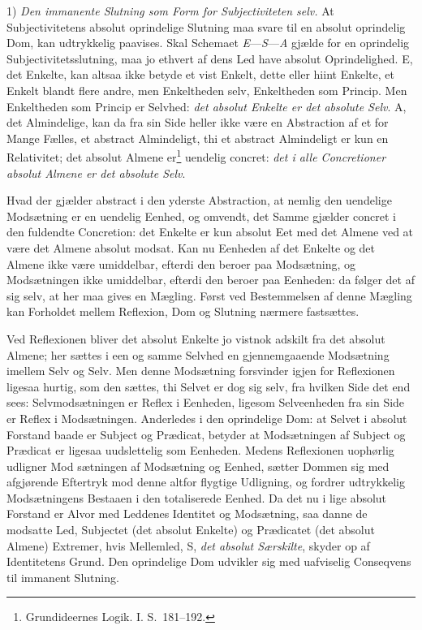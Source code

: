 \documentclass[12pt]{book}
\newcommand{\opage}[1]{\marginnote{\footnotesize\textit{[#1]}}}
\begin{document}
1) \emph{Den immanente Slutning som Form for Subjectiviteten selv.} At Subjectivitetens absolut oprindelige Slutning maa svare til en absolut oprindelig Dom, kan udtrykkelig paavises. Skal Schemaet \textit{E}---\textit{S}---\textit{A} gjælde for en oprindelig Subjectivitetsslutning, maa jo ethvert af
\opage{331}dens Led have absolut Oprindelighed. E, det Enkelte, kan altsaa ikke betyde et vist Enkelt, dette eller hiint Enkelte, et Enkelt blandt flere andre, men Enkeltheden selv, Enkeltheden som Princip. Men Enkeltheden som Princip er Selvhed: \emph{det absolut Enkelte er det absolute Selv}. A, det Almindelige, kan da fra sin Side heller ikke være en Abstraction af et for Mange Fælles, et abstract Almindeligt, thi et abstract Almindeligt er kun en Relativitet; det absolut Almene er\footnote{Grundideernes Logik. I. S.~181--192.}%
{} uendelig concret: \emph{det i alle Concretioner absolut Almene er det absolute Selv}.

Hvad der gjælder abstract i den yderste Abstraction, at nemlig den uendelige Modsætning er en uendelig Eenhed, og omvendt, det Samme gjælder concret i den fuldendte Concretion: det Enkelte er kun absolut Eet med det Almene ved at være det Almene absolut modsat. Kan nu Eenheden af det Enkelte og det Almene ikke være umiddelbar, efterdi den beroer paa Modsætning, og Modsætningen ikke umiddelbar, efterdi den beroer paa Eenheden: da følger det af sig selv, at her maa gives en Mægling. Først ved Bestemmelsen af denne Mægling kan Forholdet mellem Reflexion, Dom og Slutning nærmere fastsættes.

Ved Reflexionen bliver det absolut Enkelte jo vistnok adskilt fra det absolut Almene; her sættes i een og samme Selvhed en gjennemgaaende Modsætning imellem Selv og Selv. Men denne Modsætning forsvinder igjen for Reflexionen ligesaa hurtig, som den sættes, thi Selvet er dog sig selv, fra hvilken Side det end sees: Selvmodsætningen er Reflex i Eenheden, ligesom Selveenheden fra sin Side er Reflex i Modsætningen. Anderledes i den oprindelige Dom: at Selvet i absolut Forstand baade er Subject og Prædicat, betyder at Modsætningen af Subject og Prædicat er ligesaa uudslettelig som Eenheden. Medens Reflexionen uophørlig udligner Mod%
\opage{332}sætningen af Modsætning og Eenhed, sætter Dommen sig med afgjørende Eftertryk mod denne altfor flygtige Udligning, og fordrer udtrykkelig Modsætningens Bestaaen i den totaliserede Eenhed. Da det nu i lige absolut Forstand er Alvor med Leddenes Identitet og Modsætning, saa danne de modsatte Led, Subjectet (det absolut Enkelte) og Prædicatet (det absolut Almene) Extremer, hvis Mellemled, S, \emph{det absolut Særskilte}, skyder op af Identitetens Grund. Den oprindelige Dom udvikler sig med uafviselig Conseqvens til immanent Slutning.
\end{document}
